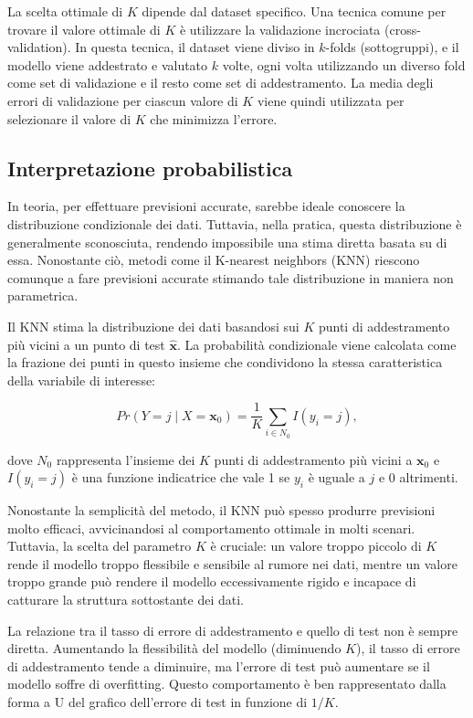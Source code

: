 La scelta ottimale di $K$ dipende dal dataset specifico. 
Una tecnica comune per trovare il valore ottimale di $K$ è utilizzare 
la validazione incrociata (cross-validation). In questa tecnica, 
il dataset viene diviso in $k$-folds (sottogruppi), e il modello 
viene addestrato e valutato $k$ volte, ogni volta utilizzando un 
diverso fold come set di validazione e il resto come set di addestramento. 
La media degli errori di validazione per ciascun valore di $K$ viene quindi 
utilizzata per selezionare il valore di $K$ che minimizza l'errore.

\subsection{Interpretazione probabilistica}

In teoria, per effettuare previsioni accurate, sarebbe ideale conoscere la distribuzione 
condizionale dei dati. Tuttavia, nella pratica, questa distribuzione è generalmente sconosciuta, 
rendendo impossibile una stima diretta basata su di essa. Nonostante ciò, metodi come il K-nearest 
neighbors (KNN) riescono comunque a fare previsioni accurate stimando tale distribuzione in maniera non parametrica.

Il KNN stima la distribuzione dei dati basandosi sui \( K \) punti di addestramento più vicini a un punto 
di test \( \hat{\mathbf{x}} \). La probabilità condizionale viene calcolata come la frazione dei punti 
in questo insieme che condividono la stessa caratteristica della variabile di interesse:

\[
Pr(Y = j \mid X = \mathbf{x}_0) = \frac{1}{K} \sum_{i \in N_0} I(y_i = j),
\]

dove \( N_0 \) rappresenta l'insieme dei \( K \) punti di addestramento più vicini a \( \mathbf{x}_0 \) e \( I(y_i = j) \) è una funzione indicatrice che vale 1 se \( y_i \) è uguale a \( j \) e 0 altrimenti.

Nonostante la semplicità del metodo, il KNN può spesso produrre previsioni molto efficaci, avvicinandosi al comportamento ottimale in molti scenari. Tuttavia, la scelta del parametro \( K \) è cruciale: un valore troppo piccolo di \( K \) rende il modello troppo flessibile e sensibile al rumore nei dati, mentre un valore troppo grande può rendere il modello eccessivamente rigido e incapace di catturare la struttura sottostante dei dati.

La relazione tra il tasso di errore di addestramento e quello di test non è sempre diretta. Aumentando la flessibilità del modello (diminuendo \( K \)), il tasso di errore di addestramento tende a diminuire, ma l'errore di test può aumentare se il modello soffre di overfitting. Questo comportamento è ben rappresentato dalla forma a U del grafico dell'errore di test in funzione di \( 1/K \).

